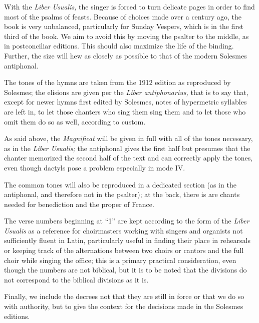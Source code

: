 \begin{enpars}
With the \textit{Liber Usualis,} the singer is forced to turn delicate pages in order to find most of the psalms of feasts. Because of choices made over a century ago, the book is very unbalanced, particularly for Sunday Vespers, which is in the first third of the book. We aim to avoid this by moving the psalter to the middle, as in postconciliar editions. This should also maximize the life of the binding. Further, the size will hew as closely as possible to that of the modern Solesmes antiphonal.

The tones of the hymns are taken from the 1912 edition as reproduced by Solesmes; the elisions are given per the \textit{Liber antiphonarius,} that is to say that, except for newer hymns first edited by Solesmes, notes of hypermetric syllables are left in, to let those chanters who sing them sing them and to let those who omit them do so as well, according to custom.

As said above, the \textit{Magnificat} will be given in full with all of the tones necessary, as in the \textit{Liber Usualis;} the antiphonal gives the first half but presumes that the chanter memorized the second half of the text and can correctly apply the tones, even though dactyls pose a problem especially in mode IV.

The common tones will also be reproduced in a dedicated section (as in the antiphonal, and therefore not in the psalter); at the back, there is are chants needed for benediction and the proper of France.

The verse numbers beginning at ``1'' are kept according to the form of the \textit{Liber Usualis} as a reference for choirmasters working with singers and organists not sufficiently fluent in Latin, particularly useful in finding their place in rehearsals or keeping track of the alternations between two choirs or cantors and the full choir while singing the office; this is a primary practical consideration, even though the numbers are not biblical, but it is to be noted that the divisions do not correspond to the biblical divisions as it is.

Finally, we include the decrees not that they are still in force or that we do so with authority, but to give the context for the decisions made in the Solesmes editions.
\end{enpars}
